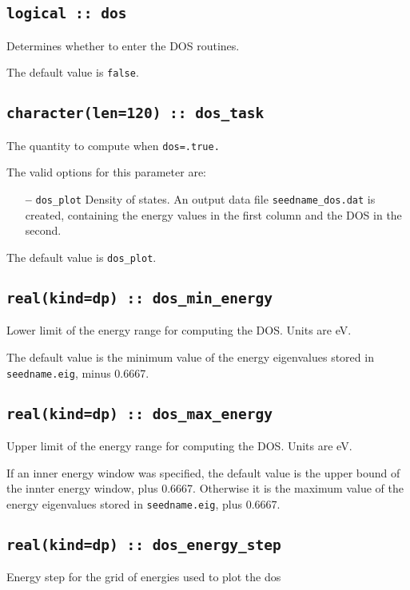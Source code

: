 \subsection[dos]{\tt logical :: dos}
Determines whether to enter the DOS routines.

The default value is \verb#false#.


\subsection[berry\_task]{\tt character(len=120) ::  dos\_task}
The quantity to compute when {\tt dos=.true.}

The valid options for this parameter are:
\begin{itemize}
\item[{\bf --}] \verb#dos_plot# Density of states. An output data file
  {\tt seedname\_dos.dat} is created, containing the energy values in
  the first column and the DOS in the second.
\end{itemize}


The default value is \verb#dos_plot#.


\subsection[dos\_win\_min]{\tt real(kind=dp) :: dos\_min\_energy}
Lower limit of the energy range for computing the DOS.
Units are eV.

The default value is the minimum value of the energy eigenvalues
stored in {\tt seedname.eig}, minus 0.6667.

\subsection[dos\_win\_max]{\tt real(kind=dp) :: dos\_max\_energy}
Upper limit of the energy range for computing the DOS.
Units are eV.

If an inner energy window was specified, 
the default value is the upper bound of the innter energy window, plus 0.6667.
Otherwise it is  the maximum value of the energy eigenvalues
stored in {\tt seedname.eig}, plus 0.6667.

\subsection[berry\_energy\_step]{\tt real(kind=dp) :: dos\_energy\_step}
Energy step for the grid of energies used to plot the dos

